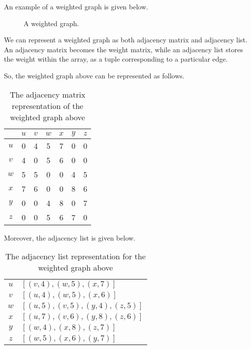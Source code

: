 \documentclass[a4paper, openany]{memoir}
\begin{document}
An example of a weighted graph is given below.
\begin{figure}[H]
    \centering
    \caption{A weighted graph.}
\end{figure}
We can represent a weighted graph as both adjacency matrix and adjacency list. An adjacency matrix becomes the weight matrix, while an adjacency list stores the weight within the array, as a tuple corresponding to a particular edge. 

So, the weighted graph above can be represented as follows.
\begin{table}[H]
    \centering
    \begin{tabular}{c|cccccc}
         & $u$ & $v$ & $w$ & $x$ & $y$ & $z$ \\
         \hline
        $u$ & 0 & 4 & 5 & 7 & 0 & 0 \\
        $v$ & 4 & 0 & 5 & 6 & 0 & 0 \\
        $w$ & 5 & 5 & 0 & 0 & 4 & 5 \\
        $x$ & 7 & 6 & 0 & 0 & 8 & 6 \\
        $y$ & 0 & 0 & 4 & 8 & 0 & 7 \\
        $z$ & 0 & 0 & 5 & 6 & 7 & 0
    \end{tabular}
    \caption{The adjacency matrix representation of the weighted graph above}
\end{table}
\noindent Moreover, the adjacency list is given below.
\begin{table}[H]
    \centering
    \begin{tabular}{c|l}
        $u$ & $[(v, 4), (w, 5), (x, 7)]$ \\
        $v$ & $[(u, 4), (w, 5), (x, 6)]$\\
        $w$ & $[(u, 5), (v, 5), (y, 4), (z, 5)]$ \\
        $x$ & $[(u, 7), (v, 6), (y, 8), (z, 6)]$\\
        $y$ & $[(w, 4), (x, 8), (z, 7)]$ \\
        $z$ & $[(w, 5), (x, 6), (y, 7)]$
    \end{tabular}
    \caption{The adjacency list representation for the weighted graph above}
\end{table}
\end{document}
